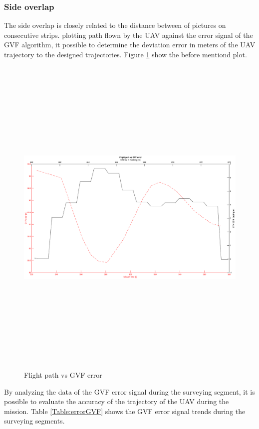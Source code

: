 \subsubsection{Side overlap}
The side overlap is closely related to the distance between of pictures on consecutive strips. plotting path flown by the UAV against the error signal of the GVF algorithm, it possible to determine the deviation  error in meters of the UAV trajectory to the designed trajectories. Figure \ref{fig:errorsignalGVF} show the before mentiond plot.
\begin{figure}[H]
\centering
\includegraphics[width=16cm,height=16cm,keepaspectratio]{imagenes/StripvsGVF.eps}
\caption{Flight path vs GVF error}
\label{fig:errorsignalGVF}
\end{figure}
By analyzing the data of the GVF error signal during the surveying segment, it is possible to evaluate the accuracy of the trajectory of the UAV during the mission. Table \ref{Table:errorGVF} shows the GVF error signal trends during the surveying segments.
